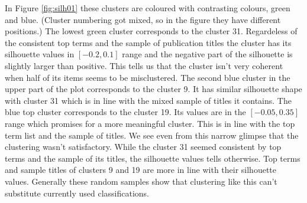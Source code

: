 In Figure \ref{fig:silh01} these clusters are coloured with 
contrasting colours, green and blue. (Cluster numbering got mixed, 
so in the figure they have different positions.)
The lowest green cluster corresponds to the cluster 31. 
Regardeless of the consistent top terms and the sample of 
publication titles the cluster has its silhouette values in 
$[-0.2, 0.1]$ range and the negative part of the silhouette is 
slightly larger than positive. This tells us that the cluster 
isn't very coherent when half of its items seems to be 
misclustered. 
The second blue cluster in the upper part of 
the plot corresponds to the cluster 9. It has similar silhouette 
shape with cluster 31 which is in line with the mixed sample of 
titles it contains. 
The blue top cluster corresponds to the cluster 19. Its values are
in the $[-0.05, 0.35]$ range which promises for a more meaningful 
cluster. This is in line with the top term list and the sample of 
titles.
We see even from this narrow glimpse that the clustering wasn't 
satisfactory. While the cluster 31 seemed consistent by top terms 
and the sample of its titles, the silhouette values tells otherwise.
Top terms and sample titles of clusters 9 and 19 are more in line
with their silhouette values. Generally these random samples show
that clustering like this can't substitute currently used 
classifications.



%
